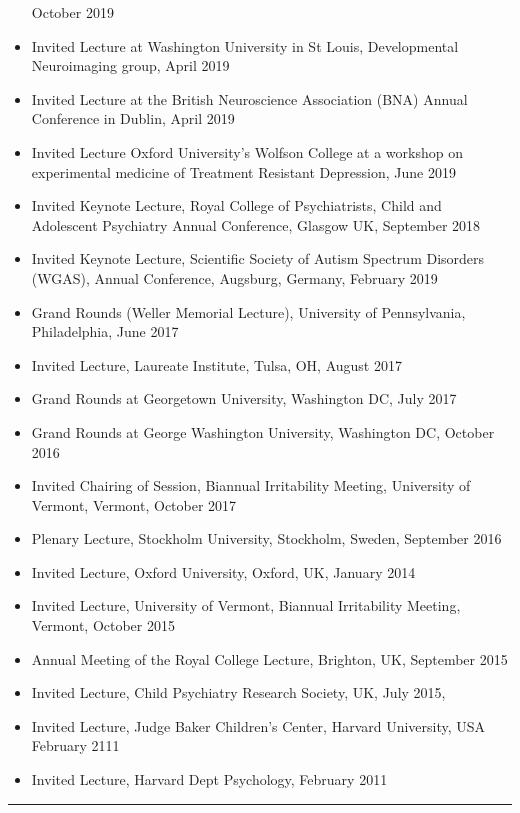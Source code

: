 \documentclass[
]{article}
\begin{document}
\begin{itemize}
  October 2019
\item
  Invited Lecture at Washington University in St Louis, Developmental
  Neuroimaging group, April 2019
\item
  Invited Lecture at the British Neuroscience Association (BNA) Annual
  Conference in Dublin, April 2019
\item
  Invited Lecture Oxford University's Wolfson College at a workshop on
  experimental medicine of Treatment Resistant Depression, June 2019
\item
  Invited Keynote Lecture, Royal College of Psychiatrists, Child and
  Adolescent Psychiatry Annual Conference, Glasgow UK, September 2018
\item
  Invited Keynote Lecture, Scientific Society of Autism Spectrum
  Disorders (WGAS), Annual Conference, Augsburg, Germany, February 2019
\item
  Grand Rounds (Weller Memorial Lecture), University of Pennsylvania,
  Philadelphia, June 2017
\item
  Invited Lecture, Laureate Institute, Tulsa, OH, August 2017
\item
  Grand Rounds at Georgetown University, Washington DC, July 2017
\item
  Grand Rounds at George Washington University, Washington DC, October
  2016
\item
  Invited Chairing of Session, Biannual Irritability Meeting, University
  of Vermont, Vermont, October 2017
\item
  Plenary Lecture, Stockholm University, Stockholm, Sweden, September
  2016
\item
  Invited Lecture, Oxford University, Oxford, UK, January 2014
\item
  Invited Lecture, University of Vermont, Biannual Irritability Meeting,
  Vermont, October 2015
\item
  Annual Meeting of the Royal College Lecture, Brighton, UK, September
  2015
\item
  Invited Lecture, Child Psychiatry Research Society, UK, July 2015,
\item
  Invited Lecture, Judge Baker Children's Center, Harvard University,
  USA February 2111
\item
  Invited Lecture, Harvard Dept Psychology, February 2011
\end{itemize}

\begin{center}\rule{0.5\linewidth}{0.5pt}\end{center}
\end{document}
